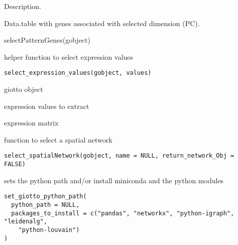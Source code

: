 \documentclass[a4paper]{book}
\begin{document}
%
\begin{Details}\relax
Description.
\end{Details}
%
\begin{Value}
Data.table with genes associated with selected dimension (PC).
\end{Value}
%
\begin{Examples}
\begin{ExampleCode}
    selectPatternGenes(gobject)
\end{ExampleCode}
\end{Examples}
%
\begin{Description}\relax
helper function to select expression values
\end{Description}
%
\begin{Usage}
\begin{verbatim}
select_expression_values(gobject, values)
\end{verbatim}
\end{Usage}
%
\begin{Arguments}
\begin{ldescription}
\item[\code{gobject}] giotto object

\item[\code{values}] expression values to extract
\end{ldescription}
\end{Arguments}
%
\begin{Value}
expression matrix
\end{Value}
%
\begin{Description}\relax
function to select a spatial network
\end{Description}
%
\begin{Usage}
\begin{verbatim}
select_spatialNetwork(gobject, name = NULL, return_network_Obj = FALSE)
\end{verbatim}
\end{Usage}
%
\begin{Description}\relax
sets the python path and/or install miniconda and the python modules
\end{Description}
%
\begin{Usage}
\begin{verbatim}
set_giotto_python_path(
  python_path = NULL,
  packages_to_install = c("pandas", "networkx", "python-igraph", "leidenalg",
    "python-louvain")
)
\end{verbatim}
\end{Usage}
\end{document}
